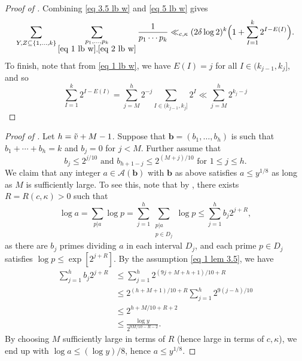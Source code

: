 \documentclass{amsart}
\theoremstyle{definition}
\numberwithin{equation}{section}
\newcommand{\density}{\delta}
\begin{document}
\begin{proof}[Proof of ]
	Combining \eqref{eq 3.5 lb w} and \eqref{eq 5 lb w} gives
	\begin{equation}
		\sum_{Y,Z \subseteq \{1,\dots,k\}}  \sum_{\substack{p_1,\dots,p_k\\ \eqref{eq 1 lb w}, \eqref{eq 2 lb w}}} \frac{1}{p_1\cdots p_k} \ll_{c,\kappa}(2\density \log 2)^k\Big(1+ \sum_{I = 1}^k 2^{I-E(I)}\Big).
	\end{equation}
	To finish, note that from \eqref{eq 1 lb w}, we have $E(I) = j$ for all $I \in (k_{j-1},k_j]$, and so
	$$\sum_{I = 1}^k 2^{I-E(I)} = \sum_{j = M}^h 2^{-j} \sum_{I \in (k_{j-1},k_j]} 2^{I} \ll \sum_{j = M}^h 2^{k_j-j}$$
	
	
	
\end{proof}

\begin{proof}[Proof of ]
	Let $h = \Tilde{v}+M-1$. Suppose that $\bm{b} = (b_1,\dots,b_h)$ is such that $b_1 +\cdots + b_h = k$ and $b_j = 0$ for $j < M$. Further assume that
	\begin{equation}\label{eq 1 lem 3.5}
		b_j \leq 2^{j/10}\text{ and } b_{h+1-j} \leq 2^{(M+j)/10} \text{ for } 1 \leq j \leq h.
	\end{equation}
	We claim that any integer $a \in \mathscr{A}(\bm{b})$ with $\bm{b}$ as above satisfies $a \leq y^{1/8}$ as long as $M$ is sufficiently large. To see this, note that by , there exists $R = R(c,\kappa) > 0$ such that 
	$$\log a = \sum_{p|a} \log p = \sum_{j=1}^h \sum_{\substack{p|a\\ p \in D_j}} \log p \le \sum_{j=1}^h b_j 2^{j+R} ,$$
	as there are $b_j$ primes dividing $a$ in each interval $D_j$, and each prime $p \in D_j$ satisfies $ \log p \leq  \exp[2^{j+R}]$. By the assumption \eqref{eq 1 lem 3.5}, we have 
	\begin{align*}
		\sum_{j=1}^h b_j 2^{j+R} &\leq \sum_{j = 1}^h 2^{(9j+M+h+1)/10+R}\\
		&\leq 2^{(h+M+1)/10 + R} \sum_{j = 1}^h2^{9(j-h)/10}\\
		&\leq 2^{h+M/10+R+2}\\ & \leq \frac{\log y}{2^{9M/10 - R -2}}.
	\end{align*}
	By choosing $M$ sufficiently large in terms of $R$ (hence large in terms of $c,\kappa$), we end up with $\log a \leq (\log y)/8$, hence $a \leq y^{1/8}$. 
	

\end{proof}
\end{document}
